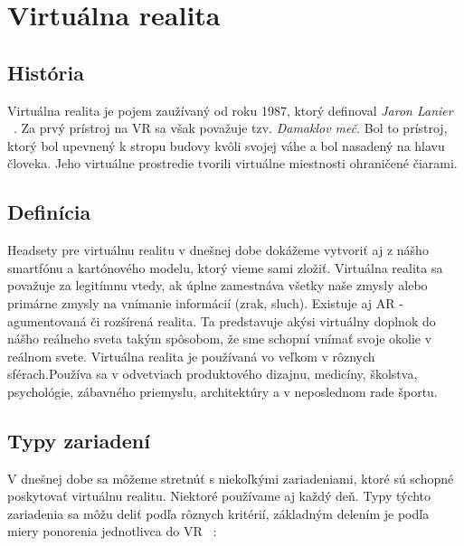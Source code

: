 \documentclass[10pt,twoside,slovak,a4paper]{article}										%
\begin{document}
\section{Virtuálna realita}	\label{VR}
\subsection{História} \label{VR:hist}		
Virtuálna realita je pojem zaužívaný od roku 1987, ktorý definoval \emph{Jaron Lanier} ~\cite{Jaron:zdroj}. Za prvý prístroj na VR sa však považuje tzv. \emph{Damaklov meč}. Bol to prístroj, ktorý bol upevnený k stropu budovy kvôli svojej váhe a bol nasadený na hlavu človeka. Jeho virtuálne prostredie tvorili virtuálne miestnosti ohraničené čiarami.

\subsection {Definícia} \label{VR:now}
Headsety pre virtuálnu realitu v dnešnej dobe dokážeme vytvoriť aj z nášho smartfónu a kartónového modelu, ktorý vieme sami zložiť. Virtuálna realita sa považuje za legitímnu vtedy, ak úplne zamestnáva všetky naše zmysly alebo primárne zmysly na vnímanie informácií (zrak, sluch). Existuje aj AR - agumentovaná či rozšírená realita. Ta predstavuje akýsi virtuálny doplnok do nášho reálneho sveta takým spôsobom, že sme schopní vnímať svoje okolie v reálnom svete. Virtuálna realita je používaná vo veľkom v rôznych sférach.Používa sa v odvetviach produktového dizajnu, medicíny, školstva, psychológie, zábavného priemyslu, architektúry a v neposlednom rade športu.~\cite{zhrnutie:zdroj}

\subsection{Typy zariadení} \label{VR:typy}
V dnešnej dobe sa môžeme stretnúť s niekoľkými zariadeniami, ktoré sú schopné poskytovať virtuálnu realitu. Niektoré používame aj každý deň.
Typy týchto zariadenia sa môžu deliť podľa rôznych kritérií, základným delením je podľa miery ponorenia jednotlivca do VR ~\cite{types:zdroj}:
\end{document}
